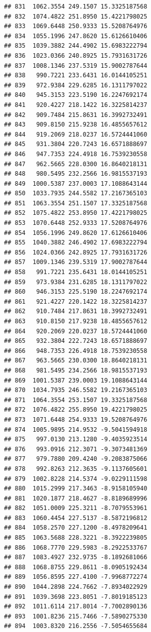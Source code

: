 \documentclass[
]{article}
\begin{document}
\begin{verbatim}
## 831  1062.3554 249.1507 15.3325187568
## 832  1074.4822 251.8950 15.4221798025
## 833  1069.6448 250.9333 15.5208764976
## 834  1055.1996 247.8620 15.6126610406
## 835  1039.3882 244.4902 15.6983222794
## 836  1023.0366 240.8925 15.7931631726
## 837  1008.1346 237.5319 15.9002787644
## 838   990.7221 233.6431 16.0144105251
## 839   972.9384 229.6285 16.1311797022
## 840   945.3153 223.5190 16.2247692174
## 841   920.4227 218.1422 16.3225814237
## 842   909.7484 215.8631 16.3992732491
## 843   909.8150 215.9238 16.4855657612
## 844   919.2069 218.0237 16.5724441060
## 845   931.3804 220.7243 16.6571888697
## 846   947.7353 224.4918 16.7539230558
## 847   962.5665 228.0300 16.8640218131
## 848   980.5495 232.2566 16.9815537193
## 849  1000.5387 237.0003 17.1088643144
## 850  1033.7935 244.5582 17.2167365103
## 851  1063.3554 251.1507 17.3325187568
## 852  1075.4822 253.8950 17.4221798025
## 853  1070.6448 252.9333 17.5208764976
## 854  1056.1996 249.8620 17.6126610406
## 855  1040.3882 246.4902 17.6983222794
## 856  1024.0366 242.8925 17.7931631726
## 857  1009.1346 239.5319 17.9002787644
## 858   991.7221 235.6431 18.0144105251
## 859   973.9384 231.6285 18.1311797022
## 860   946.3153 225.5190 18.2247692174
## 861   921.4227 220.1422 18.3225814237
## 862   910.7484 217.8631 18.3992732491
## 863   910.8150 217.9238 18.4855657612
## 864   920.2069 220.0237 18.5724441060
## 865   932.3804 222.7243 18.6571888697
## 866   948.7353 226.4918 18.7539230558
## 867   963.5665 230.0300 18.8640218131
## 868   981.5495 234.2566 18.9815537193
## 869  1001.5387 239.0003 19.1088643144
## 870  1034.7935 246.5582 19.2167365103
## 871  1064.3554 253.1507 19.3325187568
## 872  1076.4822 255.8950 19.4221798025
## 873  1071.6448 254.9333 19.5208764976
## 874  1005.9895 214.9532 -9.5041594918
## 875   997.0130 213.1280 -9.4035923514
## 876   993.0916 212.3071 -9.3073481369
## 877   979.7880 209.4240 -9.2083875066
## 878   992.8263 212.3635 -9.1137605601
## 879  1002.8228 214.5374 -9.0229111598
## 880  1015.2999 217.3463 -8.9158105940
## 881  1020.1877 218.4627 -8.8189689996
## 882  1051.0009 225.3211 -8.7079553961
## 883  1060.4454 227.5137 -8.5872196812
## 884  1058.2570 227.1200 -8.4978209641
## 885  1063.5688 228.3221 -8.3922239805
## 886  1068.7770 229.5983 -8.2922533767
## 887  1083.4927 232.9735 -8.1892681066
## 888  1068.8755 229.8611 -8.0905192434
## 889  1056.8595 227.4100 -7.9968772274
## 890  1044.2898 224.7662 -7.8934022929
## 891  1039.3698 223.8051 -7.8019185123
## 892  1011.6114 217.8014 -7.7002890136
## 893  1001.8236 215.7466 -7.5890275330
## 894  1003.8320 216.2556 -7.5054655684

\end{verbatim}
\end{document}
